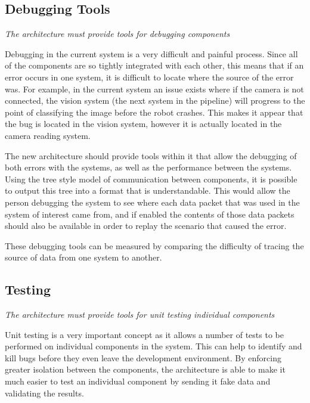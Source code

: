 \documentclass[english,12pt]{scrartcl}
\newcommand{\requirement}[1]{\textit{#1}}
\begin{document}
		\subsection{Debugging Tools}
			\requirement{The architecture must provide tools for debugging components}

			Debugging in the current system is a very difficult and painful process. Since all of
			the components are so tightly integrated with each other, this means that if an error
			occurs in one system, it is difficult to locate where the source of the error was. For
			example, in the current system an issue exists where if the camera is not connected, the
			vision system (the next system in the pipeline) will progress to the point of
			classifying the image before the robot crashes. This makes it appear that the bug is
			located in the vision system, however it is actually located in the camera reading
			system.

			The new architecture should provide tools within it that allow the debugging of both
			errors with the systems, as well as the performance between the systems. Using the tree
			style model of communication between components, it is possible to output this tree into
			a format that is understandable. This would allow the person debugging the system to see
			where each data packet that was used in the system of interest came from, and if enabled
			the contents of those data packets should also be available in order to replay the
			scenario that caused the error.

			These debugging tools can be measured by comparing the difficulty of tracing the source
			of data from one system to another.


		\subsection{Testing}
			\requirement{The architecture must provide tools for unit testing individual components}

			Unit testing is a very important concept as it allows a number of tests to be performed
			on individual components in the system. This can help to identify and kill bugs before
			they even leave the development environment. By enforcing greater isolation between the
			components, the architecture is able to make it much easier to test an individual
			component by sending it fake data and validating the results.
\end{document}
